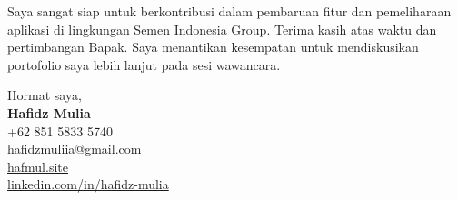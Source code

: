 \documentclass[a4paper,11pt]{article}
\begin{document}
Saya sangat siap untuk berkontribusi dalam pembaruan fitur dan pemeliharaan aplikasi di lingkungan Semen Indonesia Group. Terima kasih atas waktu dan pertimbangan Bapak. Saya menantikan kesempatan untuk mendiskusikan portofolio saya lebih lanjut pada sesi wawancara.

\vspace{10pt}
Hormat saya,\\[18pt]
\textbf{Hafidz Mulia}\\
+62 851 5833 5740\\
\href{mailto:hafidzmuliia@gmail.com}{hafidzmuliia@gmail.com}\\
\href{https://hafmul.site}{hafmul.site}\\
\href{https://www.linkedin.com/in/hafidz-mulia/}{linkedin.com/in/hafidz-mulia}
\end{document}
